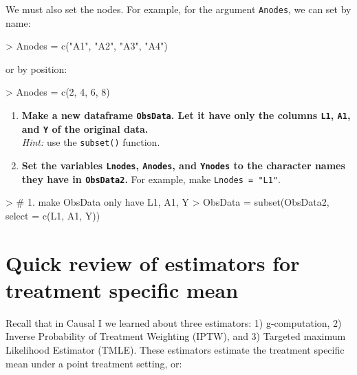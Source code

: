 \documentclass[answers]{exam}
\begin{document}
We must also set the nodes. For example, for the argument \texttt{Anodes}, we can set by name:
\begin{Schunk}
\begin{Sinput}
> Anodes = c("A1", "A2", "A3", "A4")
\end{Sinput}
\end{Schunk}
or by position:
\begin{Schunk}
\begin{Sinput}
> Anodes = c(2, 4, 6, 8)
\end{Sinput}
\end{Schunk}



\begin{enumerate}
\item \textbf{Make a new dataframe \texttt{ObsData}. Let it have only the columns \texttt{L1}, \texttt{A1}, and \texttt{Y} of the original data.} \\
\emph{Hint:} use the \texttt{subset()} function.
\item \textbf{Set the variables \texttt{Lnodes}, \texttt{Anodes}, and \texttt{Ynodes} to the character names they have in \texttt{ObsData2}.} For example, make \texttt{Lnodes = "L1"}.
\end{enumerate}

\begin{solution}
\begin{Schunk}
\begin{Sinput}
> # 1. make ObsData only have L1, A1, Y
> ObsData = subset(ObsData2, select = c(L1, A1, Y))
\end{Sinput}
\end{Schunk}
\begin{Schunk}
\end{Schunk}
\end{solution}

\section{Quick review of estimators for treatment specific mean}

Recall that in Causal I we learned about three estimators: 1) g-computation, 2) Inverse Probability of Treatment Weighting (IPTW), and 3) Targeted maximum Likelihood Estimator (TMLE). These estimators estimate the treatment specific mean under a point treatment setting, or: 
\end{document}
